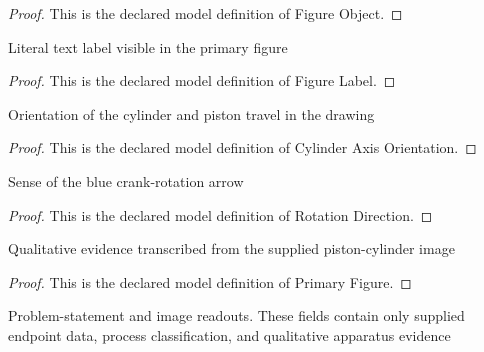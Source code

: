 \begin{proof}
  This is the declared model definition of Figure Object.
\end{proof}
\begin{definition}
  \label{def:physics:phyx-mini-0459:phyxminiproblems-problemphyxmini0459-figurelabel}
  Literal text label visible in the primary figure
\end{definition}
\begin{proof}
  This is the declared model definition of Figure Label.
\end{proof}
\begin{definition}
  \label{def:physics:phyx-mini-0459:phyxminiproblems-problemphyxmini0459-cylinderaxisorientation}
  Orientation of the cylinder and piston travel in the drawing
\end{definition}
\begin{proof}
  This is the declared model definition of Cylinder Axis Orientation.
\end{proof}
\begin{definition}
  \label{def:physics:phyx-mini-0459:phyxminiproblems-problemphyxmini0459-rotationdirection}
  Sense of the blue crank-rotation arrow
\end{definition}
\begin{proof}
  This is the declared model definition of Rotation Direction.
\end{proof}
\begin{definition}
  \label{def:physics:phyx-mini-0459:phyxminiproblems-problemphyxmini0459-primaryfigure}
  Qualitative evidence transcribed from the supplied piston-cylinder image
\end{definition}
\begin{proof}
  This is the declared model definition of Primary Figure.
\end{proof}
\begin{definition}
  \label{def:physics:phyx-mini-0459:phyxminiproblems-problemphyxmini0459-matchesproblemandprimaryfigure}
  Problem-statement and image readouts. These fields contain only supplied endpoint data, process classification, and qualitative apparatus evidence
\end{definition}

